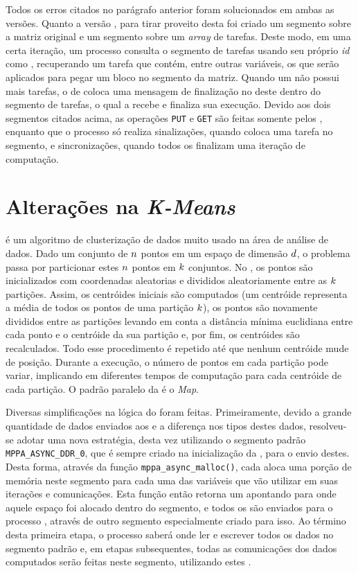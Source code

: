 Todos os erros citados no parágrafo anterior foram solucionados em ambas as versões. Quanto a versão \ASYNC, para tirar proveito desta \API foi criado um segmento sobre a matriz original e um segmento sobre um \textit{array} de tarefas. Deste modo, em uma certa iteração, um processo \slave consulta o segmento de tarefas usando seu próprio \textit{id} como \offset, recuperando um tarefa que contém, entre outras variáveis, os \offsets que serão aplicados para pegar um bloco no segmento da matriz. Quando um \CC não possui mais tarefas, o \cluster de \IO coloca uma mensagem de finalização no \offset deste \slave dentro do segmento de tarefas, o qual a recebe e finaliza sua execução. Devido aos dois segmentos citados acima, as operações \texttt{PUT} e \texttt{GET} são feitas somente pelos \CCs, enquanto que o processo \master só realiza sinalizações, quando coloca uma tarefa no segmento, e sincronizações, quando todos os \slaves finalizam uma iteração de computação.

\section{Alterações na \textit{K-Means}}
\label{sec:alteracoeskm}

\textit{\KM} é um algoritmo de clusterização de dados muito usado na área de análise de dados. Dado um conjunto de $\mathnormal{n}$ pontos em um espaço de dimensão $\mathnormal{d}$, o problema passa por particionar estes $\mathnormal{n}$ pontos em $\mathnormal{k}$ conjuntos. No \capb, os pontos são inicializados com coordenadas aleatorias e divididos aleatoriamente entre as $\mathnormal{k}$ partições. Assim, os centróides iniciais são computados (um centróide representa a média de todos os pontos de uma partição $\mathnormal{k}$), os pontos são novamente divididos entre as partições levando em conta a distância mínima euclidiana entre cada ponto e o centróide da sua partição e, por fim, os centróides são recalculados. Todo esse procedimento é repetido até que nenhum centróide mude de posição. Durante a execução, o número de pontos em cada partição pode variar, implicando em diferentes tempos de computação para cada centróide de cada partição. O padrão paralelo da \KM é o \textit{Map}.

Diversas simplificações na lógica do  \KM foram feitas. Primeiramente, devido a grande quantidade de dados enviados aos \CCs e a diferença nos tipos destes dados, resolveu-se adotar uma nova estratégia, desta vez utilizando o segmento padrão \texttt{MPPA\_ASYNC\_DDR\_0}, que é sempre criado na inicialização da \ASYNC, para o envio destes. Desta forma, através da função \texttt{mppa\_async\_malloc()}, cada \slave aloca uma porção de memória neste segmento para cada uma das variáveis que vão utilizar em suas iterações e comunicações. Esta função então retorna um \offset apontando para onde aquele espaço foi alocado dentro do segmento, e todos os \offsets são enviados para o processo \master, através de outro segmento especialmente criado para isso. Ao término desta primeira etapa, o processo \master saberá onde ler e escrever todos os dados no segmento padrão e, em etapas subsequentes, todas as comunicações dos dados computados serão feitas neste segmento, utilizando estes \offsets.

